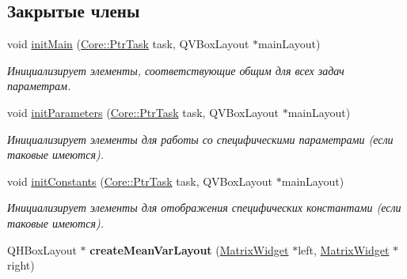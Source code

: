 \subsection*{Закрытые члены}
\begin{DoxyCompactItemize}
\item 
void \hyperlink{class_task_parameters_widget_ae35d8d16a02797220c4cd9f2b0ead18a}{init\+Main} (\hyperlink{namespace_core_abfda8f69fcacfcea2696549b548ed737}{Core\+::\+Ptr\+Task} task, Q\+V\+Box\+Layout $\ast$main\+Layout)\hypertarget{class_task_parameters_widget_ae35d8d16a02797220c4cd9f2b0ead18a}{}\label{class_task_parameters_widget_ae35d8d16a02797220c4cd9f2b0ead18a}

\begin{DoxyCompactList}\small\item\em Инициализирует элементы, соответствующие общим для всех задач параметрам. \end{DoxyCompactList}\item 
void \hyperlink{class_task_parameters_widget_ab88a1f7ceb86323733ee0e6b9b37d1f7}{init\+Parameters} (\hyperlink{namespace_core_abfda8f69fcacfcea2696549b548ed737}{Core\+::\+Ptr\+Task} task, Q\+V\+Box\+Layout $\ast$main\+Layout)\hypertarget{class_task_parameters_widget_ab88a1f7ceb86323733ee0e6b9b37d1f7}{}\label{class_task_parameters_widget_ab88a1f7ceb86323733ee0e6b9b37d1f7}

\begin{DoxyCompactList}\small\item\em Инициализирует элементы для работы со специфическими параметрами (если таковые имеются). \end{DoxyCompactList}\item 
void \hyperlink{class_task_parameters_widget_a69fbd1302d74e2e8eef29fb333c18432}{init\+Constants} (\hyperlink{namespace_core_abfda8f69fcacfcea2696549b548ed737}{Core\+::\+Ptr\+Task} task, Q\+V\+Box\+Layout $\ast$main\+Layout)\hypertarget{class_task_parameters_widget_a69fbd1302d74e2e8eef29fb333c18432}{}\label{class_task_parameters_widget_a69fbd1302d74e2e8eef29fb333c18432}

\begin{DoxyCompactList}\small\item\em Инициализирует элементы для отображения специфических константами (если таковые имеются). \end{DoxyCompactList}\item 
Q\+H\+Box\+Layout $\ast$ {\bfseries create\+Mean\+Var\+Layout} (\hyperlink{class_matrix_widget}{Matrix\+Widget} $\ast$left, \hyperlink{class_matrix_widget}{Matrix\+Widget} $\ast$right)\hypertarget{class_task_parameters_widget_aaef0cd523b0a6e78b223d27f0b2de268}{}\label{class_task_parameters_widget_aaef0cd523b0a6e78b223d27f0b2de268}

\end{DoxyCompactItemize}
